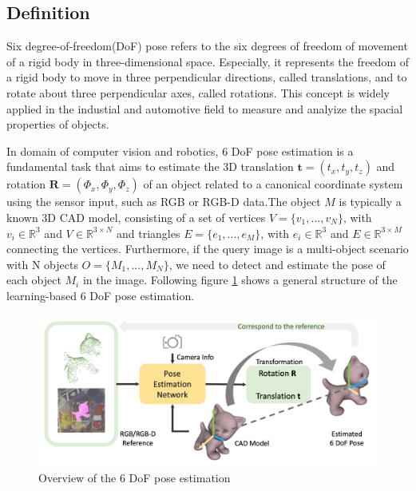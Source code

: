 \documentclass[12pt,DIV14,BCOR12mm,a4paper,footinclude=false,headinclude,parskip=half-,twoside,openright,cleardoublepage=empty,toc=index,bibliography=totoc,listof=totoc]{scrreprt}
\numberwithin{equation}{chapter}
\begin{document}
\subsection{Definition}
Six degree-of-freedom(DoF) pose refers to the six degrees of freedom of movement of a rigid body in three-dimensional space. Especially, it represents the freedom of a rigid body to move in three perpendicular directions, called translations, and to rotate about three perpendicular axes, called rotations. This concept is widely applied in the industial and automotive field to measure and analyize the spacial properties of objects.

In domain of computer vision and robotics, 6 DoF pose estimation is a fundamental task that aims to estimate the 3D translation $\mathbf{t}=(t_{x} ,t_{y} ,t_{z} )$ and rotation $\mathbf{R}=(\Phi_{x} ,\Phi_{y} ,\Phi_{z} )$ of an object related to a canonical coordinate system using the sensor input, such as RGB or RGB-D data\cite{peng_pvnet_2019}.The object $M$ is typically a known 3D CAD model, consisting of a set of vertices $V=\{v_1,...,v_N\}$, with $v_i\in \mathbb{R}^3$ and $V\in \mathbb{R}^{3 \times N}$ and triangles $E=\{e_1,...,e_M\}$, with $e_i\in \mathbb{R}^3$ and $E\in \mathbb{R}^{3\times M}$ connecting the vertices. Furthermore, if the query image is a multi-object scenario with N objects $O=\{M_1,...,M_N\}$, we need to detect and estimate the pose of each object $M_i$ in the image\cite{Fabian_2021}.
Following figure \ref{img:6d} shows a general structure of the learning-based 6 DoF pose estimation.

\begin{figure}[h]
	\centering
	\includegraphics[scale=.2]{img/6d.png}
	\caption{Overview of the 6 DoF pose estimation}
	\label{img:6d}
\end{figure}
\end{document}
